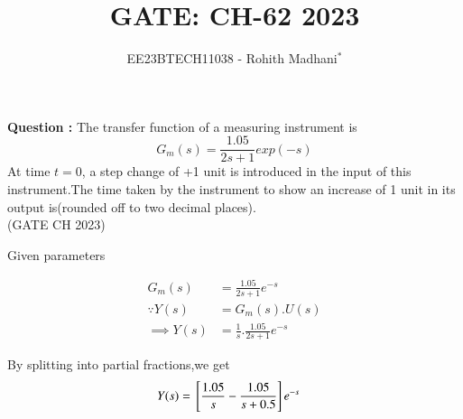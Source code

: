 \documentclass[journal,12pt,twocolumn]{IEEEtran}
\theoremstyle{remark}
\begin{document}

\vspace{3cm}

\title{GATE: CH-62 2023}
\author{EE23BTECH11038 - Rohith Madhani$^{*}$%
}
\maketitle
\newpage
\bigskip
\renewcommand{\thefigure}{\theenumi}
\renewcommand{\thetable}{\theenumi}

\textbf{Question :} The transfer function of a measuring instrument is \\
$$G_m(s) = \frac{1.05}{2s+1}exp(-s)$$
At time $t = 0$, a step change of +1 unit is introduced in the input of this instrument.The time taken by the instrument to show an increase of 1 unit in its output is(rounded off to two decimal places). \\ \hfill(GATE CH 2023) \\
\solution

\begin{table}[!h] 
\centering

\caption{Given parameters}
\label{table:gate23ch62}
\end{table}


\begin{align}
    G_m(s) &= \frac{1.05}{2s+1}e^{-s} \\
    \because Y(s) &= G_m(s).U(s) \\
    \implies Y(s) &= \frac{1}{s}.\frac{1.05}{2s+1}e^{-s}
\end{align}

By splitting into partial fractions,we get
\begin{align}
    Y(s) &= {}\left[\frac{1.05}{s} - \frac{1.05}{s+0.5}\right]e^{-s}
\end{align}
\end{document}
